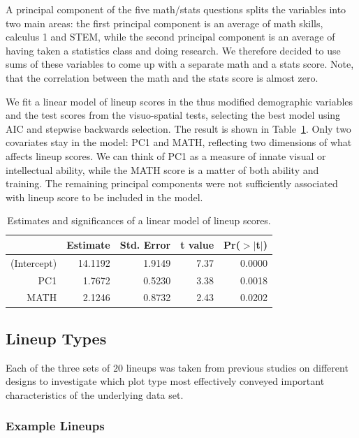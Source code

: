 \documentclass[11pt]{isuthesis}\usepackage[]{graphicx}\usepackage[]{color}
\begin{document}
A principal component of the five math/stats questions splits the variables into two main areas: the first principal component is an average of math skills, calculus 1 and STEM, while the second principal component is an average of having taken a statistics class and doing research. We therefore decided to use sums of these variables to come up with a separate math and a stats score. Note, that the correlation between the math and the stats score is almost zero. 

We fit a linear model of lineup scores in the thus modified demographic variables and the test scores from the visuo-spatial tests, selecting the best model using AIC and stepwise backwards selection. The result is shown in Table~\ref{tab:m1}. Only two covariates stay in the model: PC1 and MATH, reflecting two dimensions of what affects lineup scores. We can think of PC1 as a measure of innate visual or intellectual ability, while the MATH score is a matter of both ability and training. The remaining principal components were not sufficiently associated with lineup score to be included in the model.

\begin{table}[ht]
\centering
\caption{Estimates and significances of a linear model of lineup scores.} 
\label{tab:m1}
\begin{tabular}{rrrrr}
  \hline
 & Estimate & Std. Error & t value & Pr($>$$|$t$|$) \\ 
  \hline
(Intercept) & 14.1192 & 1.9149 & 7.37 & 0.0000 \\ 
  PC1 & 1.7672 & 0.5230 & 3.38 & 0.0018 \\ 
  MATH & 2.1246 & 0.8732 & 2.43 & 0.0202 \\ 
   \hline
\end{tabular}
\end{table}

\subsection{Lineup Types}
Each of the three sets of 20 lineups was taken from previous studies on different designs to investigate which plot type most effectively conveyed important characteristics of the underlying data set. 

\subsubsection{Example Lineups}
\end{document}
